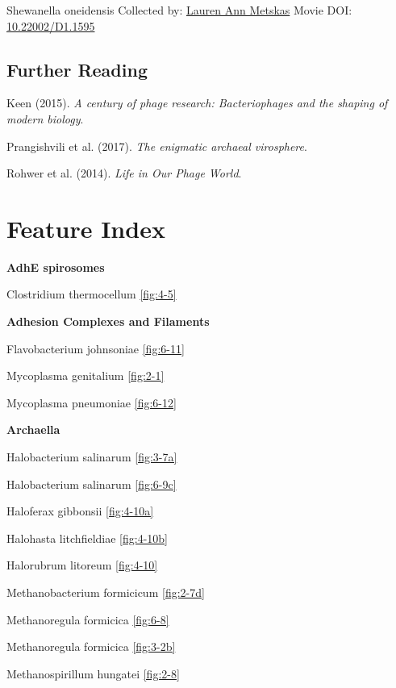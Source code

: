 \documentclass[]{tufte-book}
\begin{document}
\hypertarget{htmlwidget-1927f3530ba88793774e}{}

\label{fig:10-10}Shewanella oneidensis Collected by: \protect\hyperlink{lauren_ann_metskas}{Lauren Ann Metskas} Movie DOI: \href{https://doi.org/10.22002/D1.1595}{10.22002/D1.1595}

\hypertarget{further-reading-9}{%
\section{Further Reading}\label{further-reading-9}}

Keen (2015). \emph{A century of phage research: Bacteriophages and the shaping of modern biology}.\citep{keen2015}

Prangishvili et al. (2017). \emph{The enigmatic archaeal virosphere}.\citep{prangishvili2017}

Rohwer et al. (2014). \emph{Life in Our Phage World}.\citep{rohwer2014}

\hypertarget{appendix-appendix}{%
\appendix}


\hypertarget{feature-index}{%
\chapter{Feature Index}\label{feature-index}}

\textbf{AdhE spirosomes}

Clostridium thermocellum \ref{fig:4-5}

\textbf{Adhesion Complexes and Filaments}

Flavobacterium johnsoniae \ref{fig:6-11}

Mycoplasma genitalium \ref{fig:2-1}

Mycoplasma pneumoniae \ref{fig:6-12}

\textbf{Archaella}

Halobacterium salinarum \ref{fig:3-7a}

Halobacterium salinarum \ref{fig:6-9c}

Haloferax gibbonsii \ref{fig:4-10a}

Halohasta litchfieldiae \ref{fig:4-10b}

Halorubrum litoreum \ref{fig:4-10}

Methanobacterium formicicum \ref{fig:2-7d}

Methanoregula formicica \ref{fig:6-8}

Methanoregula formicica \ref{fig:3-2b}

Methanospirillum hungatei \ref{fig:2-8}
\end{document}
